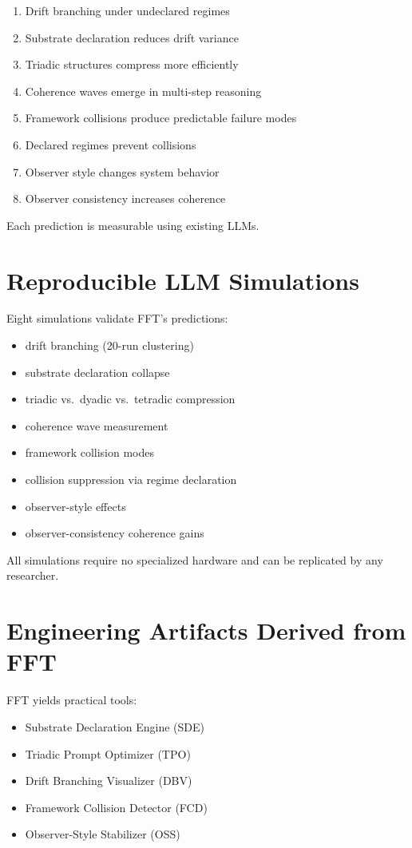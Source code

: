 \documentclass[11pt]{article}
\begin{document}
\begin{enumerate}
    \item Drift branching under undeclared regimes
    \item Substrate declaration reduces drift variance
    \item Triadic structures compress more efficiently
    \item Coherence waves emerge in multi-step reasoning
    \item Framework collisions produce predictable failure modes
    \item Declared regimes prevent collisions
    \item Observer style changes system behavior
    \item Observer consistency increases coherence
\end{enumerate}

Each prediction is measurable using existing LLMs.

\section{Reproducible LLM Simulations}

Eight simulations validate FFT's predictions:

\begin{itemize}
    \item drift branching (20-run clustering)
    \item substrate declaration collapse
    \item triadic vs.\ dyadic vs.\ tetradic compression
    \item coherence wave measurement
    \item framework collision modes
    \item collision suppression via regime declaration
    \item observer-style effects
    \item observer-consistency coherence gains
\end{itemize}

All simulations require no specialized hardware and can be replicated by any researcher.

\section{Engineering Artifacts Derived from FFT}

FFT yields practical tools:

\begin{itemize}
    \item Substrate Declaration Engine (SDE)
    \item Triadic Prompt Optimizer (TPO)
    \item Drift Branching Visualizer (DBV)
    \item Framework Collision Detector (FCD)
    \item Observer-Style Stabilizer (OSS)
\end{itemize}
\end{document}
